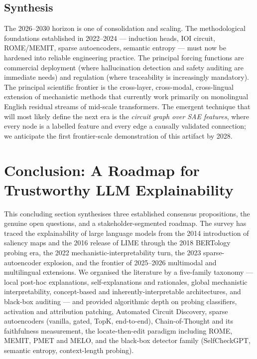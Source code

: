 \subsection{Synthesis}\label{synthesis}

The 2026--2030 horizon is one of consolidation and scaling. The methodological foundations established in 2022--2024 --- induction heads, IOI circuit, ROME/MEMIT, sparse autoencoders, semantic entropy --- must now be hardened into reliable engineering practice. The principal forcing functions are commercial deployment (where hallucination detection and safety auditing are immediate needs) and regulation (where traceability is increasingly mandatory). The principal scientific frontier is the cross-layer, cross-modal, cross-lingual extension of mechanistic methods that currently work primarily on monolingual English residual streams of mid-scale transformers. The emergent technique that will most likely define the next era is the \emph{circuit graph over SAE features}, where every node is a labelled feature and every edge a causally validated connection; we anticipate the first frontier-scale demonstration of this artifact by 2028.

\section{Conclusion: A Roadmap for Trustworthy LLM Explainability}\label{conclusion-a-roadmap-for-trustworthy-llm-explainability}

This concluding section synthesises three established consensus propositions, the genuine open questions, and a stakeholder-segmented roadmap. The survey has traced the explainability of large language models from the 2014 introduction of saliency maps and the 2016 release of LIME through the 2018 BERTology probing era, the 2022 mechanistic-interpretability turn, the 2023 sparse-autoencoder explosion, and the frontier of 2025--2026 multimodal and multilingual extensions. We organised the literature by a five-family taxonomy --- local post-hoc explanations, self-explanations and rationales, global mechanistic interpretability, concept-based and inherently-interpretable architectures, and black-box auditing --- and provided algorithmic depth on probing classifiers, activation and attribution patching, Automated Circuit Discovery, sparse autoencoders (vanilla, gated, TopK, end-to-end), Chain-of-Thought and its faithfulness measurement, the locate-then-edit paradigm including ROME, MEMIT, PMET and MELO, and the black-box detector family (SelfCheckGPT, semantic entropy, context-length probing).

